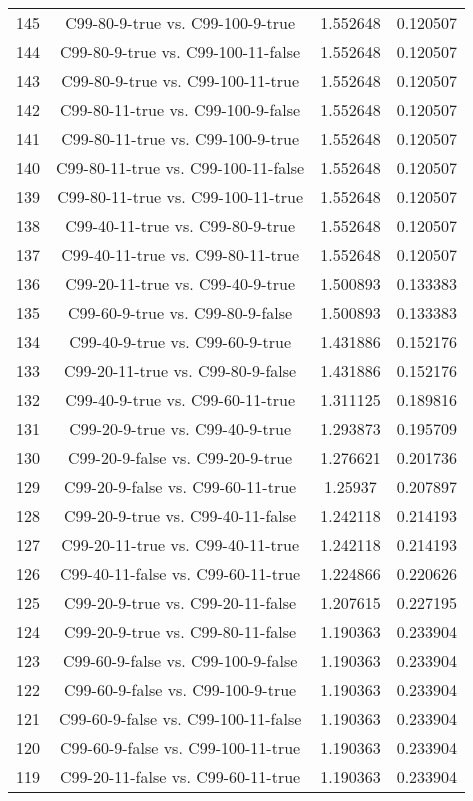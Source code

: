\documentclass[a4paper,10pt]{article}
\begin{document}
\begin{landscape}
\begin{table}[!htp]
\begin{tabular}{cccc}
145&C99-80-9-true vs. C99-100-9-true&1.552648&0.120507\\
144&C99-80-9-true vs. C99-100-11-false&1.552648&0.120507\\
143&C99-80-9-true vs. C99-100-11-true&1.552648&0.120507\\
142&C99-80-11-true vs. C99-100-9-false&1.552648&0.120507\\
141&C99-80-11-true vs. C99-100-9-true&1.552648&0.120507\\
140&C99-80-11-true vs. C99-100-11-false&1.552648&0.120507\\
139&C99-80-11-true vs. C99-100-11-true&1.552648&0.120507\\
138&C99-40-11-true vs. C99-80-9-true&1.552648&0.120507\\
137&C99-40-11-true vs. C99-80-11-true&1.552648&0.120507\\
136&C99-20-11-true vs. C99-40-9-true&1.500893&0.133383\\
135&C99-60-9-true vs. C99-80-9-false&1.500893&0.133383\\
134&C99-40-9-true vs. C99-60-9-true&1.431886&0.152176\\
133&C99-20-11-true vs. C99-80-9-false&1.431886&0.152176\\
132&C99-40-9-true vs. C99-60-11-true&1.311125&0.189816\\
131&C99-20-9-true vs. C99-40-9-true&1.293873&0.195709\\
130&C99-20-9-false vs. C99-20-9-true&1.276621&0.201736\\
129&C99-20-9-false vs. C99-60-11-true&1.25937&0.207897\\
128&C99-20-9-true vs. C99-40-11-false&1.242118&0.214193\\
127&C99-20-11-true vs. C99-40-11-true&1.242118&0.214193\\
126&C99-40-11-false vs. C99-60-11-true&1.224866&0.220626\\
125&C99-20-9-true vs. C99-20-11-false&1.207615&0.227195\\
124&C99-20-9-true vs. C99-80-11-false&1.190363&0.233904\\
123&C99-60-9-false vs. C99-100-9-false&1.190363&0.233904\\
122&C99-60-9-false vs. C99-100-9-true&1.190363&0.233904\\
121&C99-60-9-false vs. C99-100-11-false&1.190363&0.233904\\
120&C99-60-9-false vs. C99-100-11-true&1.190363&0.233904\\
119&C99-20-11-false vs. C99-60-11-true&1.190363&0.233904\\

\end{tabular}
\end{table}
\end{landscape}
\end{document}
